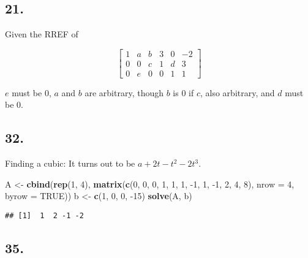 \documentclass[]{article}
\newenvironment{Shaded}{\begin{snugshade}}{\end{snugshade}}
\newcommand{\DataTypeTok}[1]{\textcolor[rgb]{0.13,0.29,0.53}{#1}}
\newcommand{\DecValTok}[1]{\textcolor[rgb]{0.00,0.00,0.81}{#1}}
\newcommand{\KeywordTok}[1]{\textcolor[rgb]{0.13,0.29,0.53}{\textbf{#1}}}
\newcommand{\NormalTok}[1]{#1}
\newcommand{\OtherTok}[1]{\textcolor[rgb]{0.56,0.35,0.01}{#1}}
\newcommand{\StringTok}[1]{\textcolor[rgb]{0.31,0.60,0.02}{#1}}
\begin{document}
\hypertarget{section-8}{%
\subsection{21.}\label{section-8}}

Given the RREF of

\[
  \begin{bmatrix}
  1 & a& b & 3 & 0  & -2\\
  0 & 0 & c & 1 & d & 3\\
  0 & e & 0 & 0 & 1 & 1
  \end{bmatrix}
\]

\(e\) must be 0, \(a\) and \(b\) are arbitrary, though \(b\) is 0 if
\(c\), also arbitrary, and \(d\) must be 0.

\hypertarget{section-9}{%
\subsection{32.}\label{section-9}}

Finding a cubic: It turns out to be \(a +2t -t^2 -2t^3\).

\begin{Shaded}
\begin{Highlighting}[]
\NormalTok{A <-}\StringTok{ }\KeywordTok{cbind}\NormalTok{(}\KeywordTok{rep}\NormalTok{(}\DecValTok{1}\NormalTok{, }\DecValTok{4}\NormalTok{),}
           \KeywordTok{matrix}\NormalTok{(}\KeywordTok{c}\NormalTok{(}\DecValTok{0}\NormalTok{, }\DecValTok{0}\NormalTok{, }\DecValTok{0}\NormalTok{, }\DecValTok{1}\NormalTok{, }\DecValTok{1}\NormalTok{, }\DecValTok{1}\NormalTok{, }\DecValTok{-1}\NormalTok{, }\DecValTok{1}\NormalTok{, }\DecValTok{-1}\NormalTok{, }\DecValTok{2}\NormalTok{, }\DecValTok{4}\NormalTok{, }\DecValTok{8}\NormalTok{), }\DataTypeTok{nrow =} \DecValTok{4}\NormalTok{, }\DataTypeTok{byrow =} \OtherTok{TRUE}\NormalTok{))}
\NormalTok{b <-}\StringTok{ }\KeywordTok{c}\NormalTok{(}\DecValTok{1}\NormalTok{, }\DecValTok{0}\NormalTok{, }\DecValTok{0}\NormalTok{, }\DecValTok{-15}\NormalTok{)}
\KeywordTok{solve}\NormalTok{(A, b)}
\end{Highlighting}
\end{Shaded}

\begin{verbatim}
## [1]  1  2 -1 -2
\end{verbatim}

\hypertarget{section-10}{%
\subsection{35.}\label{section-10}}
\end{document}
